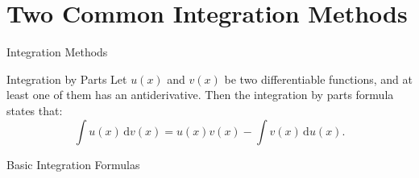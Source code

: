 \documentclass[11pt]{../../TexTemplate/elegantbook}
\begin{document}
\section{Two Common Integration Methods}
\begin{leftbarTitle}{Integration Methods}\end{leftbarTitle}
\begin{definition}{Integration by Parts}
    Let \( u(x) \) and \( v(x) \) be two differentiable functions,
    and at least one of them has an antiderivative.
    Then the integration by parts formula states that:
    \[
        \int u(x) \, \mathrm{d}v(x) = u(x)v(x) - \int v(x) \, \mathrm{d}u(x).
    \]
\end{definition}


\begin{leftbarTitle}{Basic Integration Formulas}\end{leftbarTitle}
\end{document}

